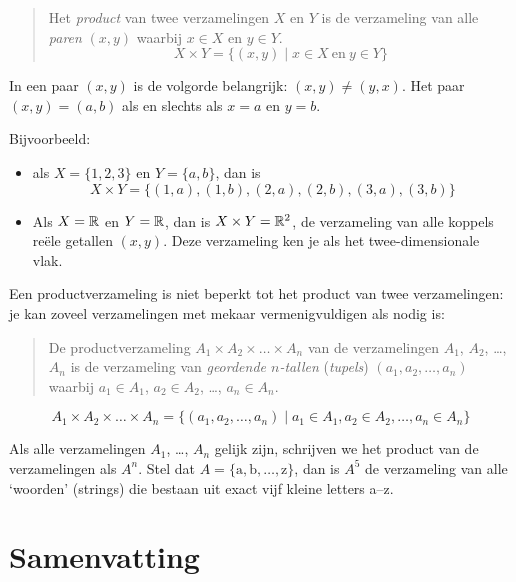 \begin{quote}

Het \emph{product} van twee verzamelingen $X$ en $Y$ is de verzameling van alle \emph{paren} $(x,y)$ waarbij $x\in X$ en $y\in Y$.
\begin{equation*}
X\times Y=\{(x,y)\mid x\in X ~\mathrm{en}~y\in Y\}
\end{equation*}

\end{quote}

In een paar $(x,y)$ is de volgorde belangrijk: $(x,y)\not =(y,x)$. Het paar $(x,y)=(a,b)$ als en slechts als $x=a$ en $y=b$.

Bijvoorbeeld: 
\begin{itemize}
\item als $X=\{1,2,3\}$ en $Y=\{a,b\}$, dan is 
\begin{equation*}
X\times Y=\{(1,a),(1,b),(2,a),(2,b),(3,a),(3,b) \}
\end{equation*}
\item Als $X=\mathbb{R}$ en $Y=\mathbb{R}$, dan is 
$X \times Y=\mathbb{R}^2$, de verzameling van alle koppels 
re\"ele getallen $(x,y)$. Deze verzameling ken je als het twee-dimensionale vlak.
\end{itemize}


Een productverzameling is niet beperkt tot het product van twee verzamelingen: je kan zoveel verzamelingen met mekaar vermenigvuldigen als nodig is:
\begin{quote}
De  productverzameling $A_1\times A_2\times\dots\times A_n$ van de verzamelingen $A_1$, $A_2$, \dots, $A_n$ is de verzameling van \emph{geordende $n$-tallen} (\emph{tupels}) $(a_1,a_2,\dots,a_n)$ waarbij $a_1\in A_1$, $a_2\in  A_2$, \dots, $a_n \in A_n$.
\end{quote}
\begin{equation*}
A_1\times A_2\times\dots\times A_n=\{(a_1,a_2,\dots,a_n)\mid a_1\in A_1, a_2\in  A_2, \dots, a_n \in A_n\}
\end{equation*}

Als alle verzamelingen $A_1$, \dots, $A_n$ gelijk zijn, schrijven we het product van de verzamelingen als $A^n$.
Stel dat $A=\{\mathrm{a}, \mathrm{b},\dots,\mathrm{z}\}$, dan is $A^5$ de verzameling van alle `woorden' (strings) die bestaan uit exact vijf kleine letters a--z.

\section{Samenvatting}
